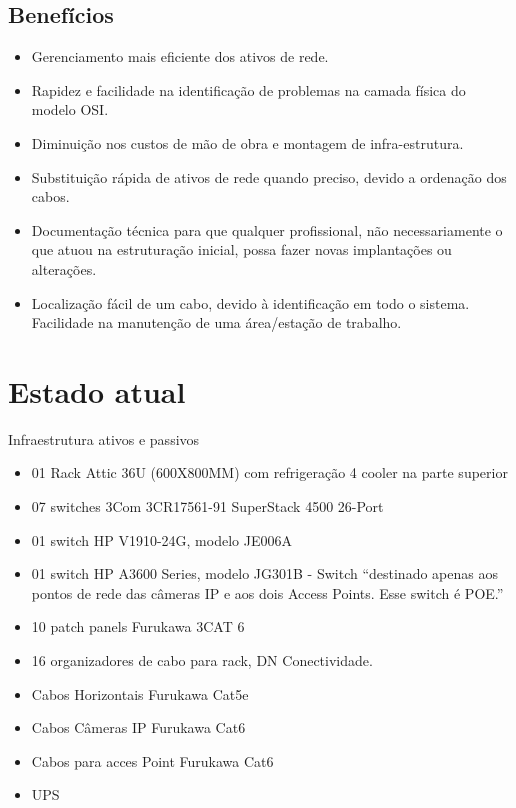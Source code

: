 \documentclass[	DIV=calc,%
							paper=a4,%
							fontsize=12pt,%
							onecolumn]{scrartcl}	 					%
\begin{document}
\subsection{Benefícios}
\begin{itemize}
\item Gerenciamento mais eficiente dos ativos de rede.
\item Rapidez e facilidade na identificação de problemas na camada física do modelo OSI.
\item Diminuição nos custos de mão de obra e montagem de infra-estrutura. 
\item Substituição rápida de ativos de rede quando preciso, devido a ordenação dos cabos. 
\item Documentação técnica para que qualquer profissional, não necessariamente o que atuou na estruturação inicial, possa fazer novas implantações ou alterações. 
\item Localização fácil de um cabo, devido à identificação em todo o sistema. Facilidade na manutenção de uma área/estação de trabalho.
\end{itemize}

\section{Estado atual}
Infraestrutura ativos e passivos 
\begin{itemize}
	\item 01 Rack Attic 36U (600X800MM) com refrigeração 4 cooler na parte superior
	\item 07 switches 3Com 3CR17561-91 SuperStack 4500 26-Port
	\item 01 switch HP V1910-24G, modelo JE006A
	\item 01 switch HP A3600 Series, modelo JG301B - Switch “destinado apenas aos pontos de rede das câmeras IP e aos dois Access Points. Esse switch é POE.”
	\item 10 patch panels Furukawa 3CAT 6
	\item 16 organizadores de cabo para rack, DN Conectividade.
	\item Cabos Horizontais Furukawa Cat5e
	\item Cabos Câmeras IP Furukawa Cat6
	\item Cabos para acces Point Furukawa Cat6
	\item UPS 
\end{itemize}
\end{document}
